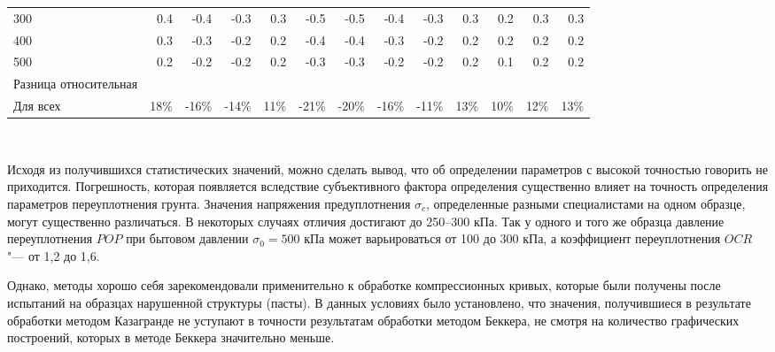 \begin{sidewaystable}[p]
\begin{tabular}{@{}lrrrrrrrrrrrr@{}}
    300 & 0.4 & -0.4 & -0.3 & 0.3 & -0.5 & -0.5 & -0.4 & -0.3 & 0.3 & 0.2 & 0.3 & 0.3 \\
    400 & 0.3 & -0.3 & -0.2 & 0.2 & -0.4 & -0.4 & -0.3 & -0.2 & 0.2 & 0.2 & 0.2 & 0.2 \\
    500 & 0.2 & -0.2 & -0.2 & 0.2 & -0.3 & -0.3 & -0.2 & -0.2 & 0.2 & 0.1 & 0.2 & 0.2 \\
    \midrule
    Разница относительная &  &  &  &  &  &  &  &  &  &  &  &  \\
    Для всех & 18\% & -16\% & -14\% & 11\% & -21\% & -20\% & -16\% & -11\% & 13\% & 10\% & 12\% & 13\% \\
    \bottomrule
    \end{tabular}
    \\ 
\end{sidewaystable}



Исходя из получившихся статистических значений, можно сделать вывод, что об определении параметров с высокой точностью говорить не приходится. Погрешность, которая появляется вследствие субъективного фактора определения существенно влияет на точность определения параметров переуплотнения грунта.
Значения напряжения предуплотнения $\sigma_c$, определенные разными специалистами на одном образце, могут существенно различаться. В некоторых случаях отличия достигают до 250--300 кПа. Так у одного и того же образца давление переуплотнения $POP$ при бытовом давлении $\sigma_0 = 500$ кПа может варьироваться от 100 до 300 кПа, а коэффициент переуплотнения $OCR$ "--- от 1,2 до 1,6.

Однако, методы хорошо себя зарекомендовали применительно к обработке компрессионных кривых, которые были получены после испытаний на образцах нарушенной структуры (пасты). В данных условиях было установлено, что значения, получившиеся в результате обработки методом Казагранде не уступают в точности результатам обработки методом Беккера, не смотря на количество графических построений, которых в методе Беккера значительно меньше. 

